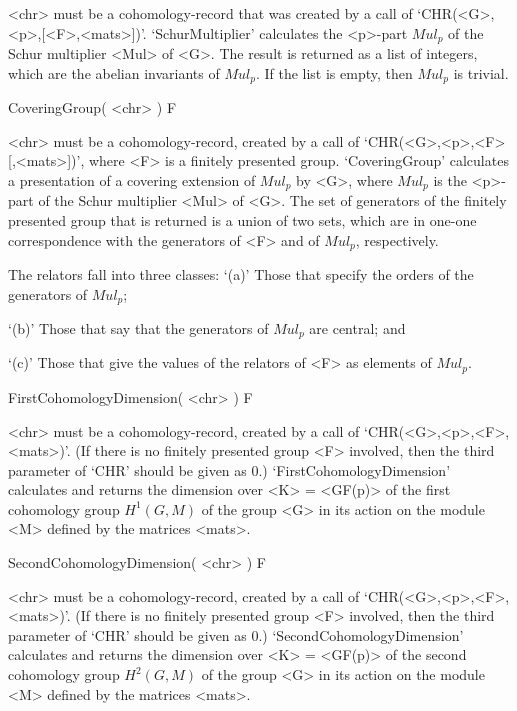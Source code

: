 <chr> must be a cohomology-record that was created by a call of
`CHR(<G>,<p>,[<F>,<mats>])'. `SchurMultiplier' calculates
the <p>-part $Mul_p$ of the Schur multiplier <Mul> of <G>.
The result is returned as a list of integers, which are the
abelian invariants of $Mul_p$. If the list is empty, then
$Mul_p$ is trivial.


\>CoveringGroup( <chr> ) F

<chr> must be a cohomology-record, created by a call of
`CHR(<G>,<p>,<F>[,<mats>])', where <F> is a finitely presented group.
`CoveringGroup' calculates a presentation of a covering extension of $Mul_p$
by <G>, where $Mul_p$ is the <p>-part of the Schur multiplier <Mul> of <G>.
The set of generators of the finitely presented group that is returned
is a union of two sets, which are in one-one correspondence with the
generators of <F> and of $Mul_p$, respectively. 

The relators fall into three classes:
\beginitems
`(a)' Those that specify the orders of the generators of $Mul_p$;

`(b)' Those that say that the generators of $Mul_p$ are central; and

`(c)'
    Those that give the values of the relators of <F> as elements of $Mul_p$.
\enditems


\>FirstCohomologyDimension( <chr> ) F

<chr> must be a cohomology-record, created by a call of
`CHR(<G>,<p>,<F>,<mats>)'. (If there is no finitely presented group <F>
involved, then the third parameter of `CHR' should be given as 0.)
`FirstCohomologyDimension' calculates and returns the dimension
over <K> = <GF(p)> of the first cohomology group $H^1(G,M)$ of the group
<G> in its action on the module <M> defined by the matrices <mats>.


\>SecondCohomologyDimension( <chr> ) F

<chr> must be a cohomology-record, created by a call of
`CHR(<G>,<p>,<F>,<mats>)'.
(If there is no finitely presented group <F> involved,
then the third parameter of `CHR' should be given as 0.)
`SecondCohomologyDimension' calculates and returns the dimension
over <K> = <GF(p)> of the second cohomology group $H^2(G,M)$ of the group
<G> in its action on the module <M> defined by the matrices <mats>.

